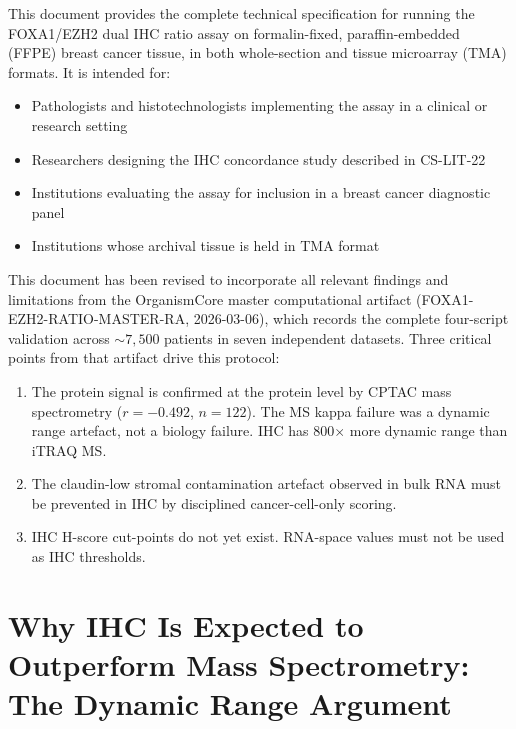 \documentclass[11pt, a4paper]{article}
\begin{document}
This document provides the complete technical
specification for running the FOXA1/EZH2 dual
IHC ratio assay on formalin-fixed,
paraffin-embedded (FFPE) breast cancer tissue,
in both whole-section and tissue microarray
(TMA) formats. It is intended for:

\begin{itemize}
    \item Pathologists and histotechnologists
    implementing the assay in a clinical or
    research setting
    \item Researchers designing the IHC
    concordance study described in CS-LIT-22
    \item Institutions evaluating the assay
    for inclusion in a breast cancer diagnostic
    panel
    \item Institutions whose archival tissue
    is held in TMA format
\end{itemize}

This document has been revised to incorporate
all relevant findings and limitations from the
OrganismCore master computational artifact
(FOXA1-EZH2-RATIO-MASTER-RA, 2026-03-06),
which records the complete four-script
validation across ${\sim}7{,}500$ patients
in seven independent datasets. Three critical
points from that artifact drive this protocol:

\begin{enumerate}
    \item The protein signal is confirmed at
    the protein level by CPTAC mass spectrometry
    ($r=-0.492$, $n=122$). The MS kappa failure
    was a dynamic range artefact, not a biology
    failure. IHC has 800$\times$ more dynamic
    range than iTRAQ MS.
    \item The claudin-low stromal contamination
    artefact observed in bulk RNA must be
    prevented in IHC by disciplined cancer-cell-only
    scoring.
    \item IHC H-score cut-points do not yet
    exist. RNA-space values must not be used
    as IHC thresholds.
\end{enumerate}

\section{Why IHC Is Expected to Outperform
Mass Spectrometry: The Dynamic Range Argument}
\label{sec:ihcrationale}
\end{document}
